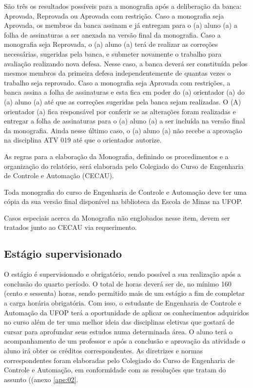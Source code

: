 São três os resultados possíveis para a monografia após a deliberação da banca: Aprovada, Reprovada ou Aprovada com restrição. Caso a monografia seja Aprovada, os membros da banca assinam e já entregam para o (a) aluno (a) a folha de assinaturas a ser anexada na versão final da monografia. Caso a monografia seja Reprovada, o (a) aluno (a) terá de realizar as correções necessárias, sugeridas pela banca, e submeter novamente o trabalho para avaliação realizando nova defesa. Nesse caso, a banca deverá ser constituída pelos mesmos membros da primeira defesa independentemente de quantas vezes o trabalho seja reprovado. Caso a monografia seja Aprovada com restrições, a banca assina a folha de assinaturas e esta fica em poder do (a) orientador (a) do (a) aluno (a) até que as correções sugeridas pela banca sejam realizadas. O (A) orientador (a) fica responsável por conferir se as alterações foram realizadas e entregar a folha de assinaturas para o (a) aluno (a) a ser incluída na versão final da monografia. Ainda nesse último caso, o (a) aluno (a) não recebe a aprovação na disciplina ATV 019 até que o orientador autorize.

As regras para a elaboração da Monografia, definindo os procedimentos e a organização do relatório, será elaborada pelo Colegiado do Curso de Engenharia de Controle e Automação (CECAU).

Toda monografia do curso de Engenharia de Controle e Automação deve ter uma cópia da sua versão final disponível na biblioteca da Escola de Minas na UFOP.

Casos especiais acerca da Monografia não englobados nesse item, devem ser tratados junto ao CECAU via requerimento. 

\subsection*{Estágio supervisionado}
O estágio é supervisionado e obrigatório, sendo possível a sua realização após a conclusão do quarto período. O total de horas deverá ser de, no mínimo 160 (cento e sessenta) horas, sendo permitido mais de um estágio a fim de completar a carga horária obrigatória.  Com isso, o estudante de Engenharia de Controle e Automação da UFOP terá a oportunidade de aplicar os conhecimentos adquiridos no curso além de ter uma melhor ideia das disciplinas eletivas que gostará de cursar para aprofundar seus estudos numa determinada área. O aluno terá o acompanhamento de um professor e após a conclusão e aprovação da atividade o aluno irá obter os créditos correspondentes. As diretrizes e normas correspondentes foram elaboradas pelo Colegiado do Curso de Engenharia de Controle e Automação, em conformidade com as resoluções que tratam do assunto ((anexo \ref{ape:02}.


